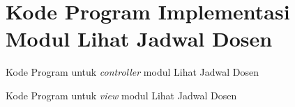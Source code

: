 \chapter{Kode Program Implementasi Modul Lihat Jadwal Dosen}
\label{Implementasi Modul Lihat Jadwal Dosen}

Kode Program untuk \textit{controller} modul Lihat Jadwal Dosen
 

Kode Program untuk \textit{view} modul Lihat Jadwal Dosen
 

